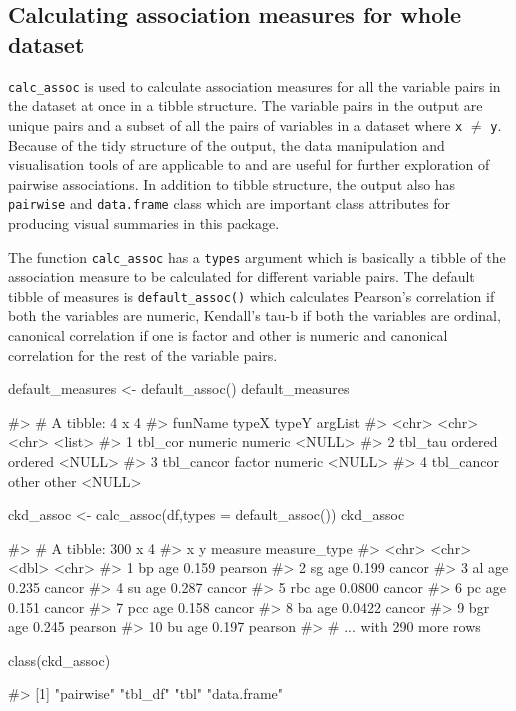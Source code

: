 \hypertarget{calculating-association-measures-for-whole-dataset}{%
\subsection{Calculating association measures for whole
dataset}\label{calculating-association-measures-for-whole-dataset}}

\texttt{calc\_assoc} is used to calculate association measures for all
the variable pairs in the dataset at once in a tibble structure. The
variable pairs in the output are unique pairs and a subset of all the
pairs of variables in a dataset where \texttt{x} \(\neq\) \texttt{y}.
Because of the tidy structure of the output, the data manipulation and
visualisation tools of  \citep{tidyverse} are
applicable to and are useful for further exploration of pairwise
associations. In addition to tibble structure, the output also has
\texttt{pairwise} and \texttt{data.frame} class which are important
class attributes for producing visual summaries in this package.

The function \texttt{calc\_assoc} has a \texttt{types} argument which is
basically a tibble of the association measure to be calculated for
different variable pairs. The default tibble of measures is
\texttt{default\_assoc()} which calculates Pearson's correlation if both
the variables are numeric, Kendall's tau-b if both the variables are
ordinal, canonical correlation if one is factor and other is numeric and
canonical correlation for the rest of the variable pairs.

\begin{Schunk}
\begin{Sinput}
default_measures <- default_assoc()
default_measures
\end{Sinput}
\begin{Soutput}
#> # A tibble: 4 x 4
#>   funName    typeX   typeY   argList
#>   <chr>      <chr>   <chr>   <list> 
#> 1 tbl_cor    numeric numeric <NULL> 
#> 2 tbl_tau    ordered ordered <NULL> 
#> 3 tbl_cancor factor  numeric <NULL> 
#> 4 tbl_cancor other   other   <NULL>
\end{Soutput}
\begin{Sinput}
ckd_assoc <- calc_assoc(df,types = default_assoc())
ckd_assoc
\end{Sinput}
\begin{Soutput}
#> # A tibble: 300 x 4
#>    x     y     measure measure_type
#>    <chr> <chr>   <dbl> <chr>       
#>  1 bp    age    0.159  pearson     
#>  2 sg    age    0.199  cancor      
#>  3 al    age    0.235  cancor      
#>  4 su    age    0.287  cancor      
#>  5 rbc   age    0.0800 cancor      
#>  6 pc    age    0.151  cancor      
#>  7 pcc   age    0.158  cancor      
#>  8 ba    age    0.0422 cancor      
#>  9 bgr   age    0.245  pearson     
#> 10 bu    age    0.197  pearson     
#> # ... with 290 more rows
\end{Soutput}
\begin{Sinput}
class(ckd_assoc)
\end{Sinput}
\begin{Soutput}
#> [1] "pairwise"   "tbl_df"     "tbl"        "data.frame"
\end{Soutput}
\end{Schunk}

